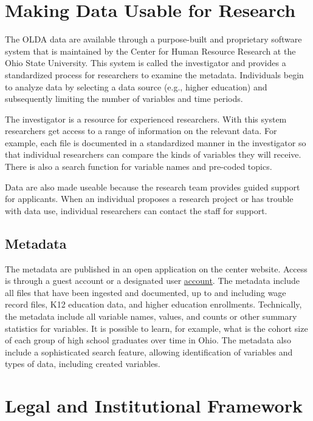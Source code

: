 \documentclass[
]{book}
\begin{document}
\hypertarget{making-data-usable-for-research-1}{%
\section{Making Data Usable for Research}\label{making-data-usable-for-research-1}}

The OLDA data are available through a purpose-built and proprietary software system that is maintained by the Center for Human Resource Research at the Ohio State University. This system is called the investigator and provides a standardized process for researchers to examine the metadata. Individuals begin to analyze data by selecting a data source (e.g., higher education) and subsequently limiting the number of variables and time periods.

The investigator is a resource for experienced researchers. With this system researchers get access to a range of information on the relevant data. For example, each file is documented in a standardized manner in the investigator so that individual researchers can compare the kinds of variables they will receive. There is also a search function for variable names and pre-coded topics.

Data are also made useable because the research team provides guided support for applicants. When an individual proposes a research project or has trouble with data use, individual researchers can contact the staff for support.

\hypertarget{metadata}{%
\subsection{Metadata}\label{metadata}}

The metadata are published in an open application on the center website. Access is through a guest account or a designated user \href{https://www.chrr.ohio-state.edu/investigator/pages/login}{account}. The metadata include all files that have been ingested and documented, up to and including wage record files, K12 education data, and higher education enrollments. Technically, the metadata include all variable names, values, and counts or other summary statistics for variables. It is possible to learn, for example, what is the cohort size of each group of high school graduates over time in Ohio. The metadata also include a sophisticated search feature, allowing identification of variables and types of data, including created variables.

\hypertarget{legal-and-institutional-framework-1}{%
\section{Legal and Institutional Framework}\label{legal-and-institutional-framework-1}}
\end{document}
